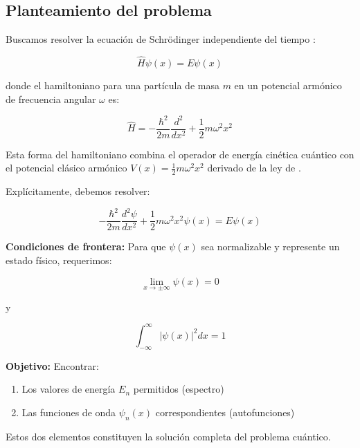 \documentclass[11pt,a4paper,spanish]{book}
\begin{document}
	\subsection{Planteamiento del problema}
	
	Buscamos resolver la ecuación de Schrödinger independiente del tiempo \citep{schrodinger1926a}:
	
	\begin{equation}
		\hat{H}\psi(x) = E\psi(x)
	\end{equation}
	
	donde el hamiltoniano para una partícula de masa $m$ en un potencial armónico de frecuencia angular $\omega$ es:
	
	\begin{equation}
		\hat{H} = -\frac{\hbar^2}{2m}\frac{d^2}{dx^2} + \frac{1}{2}m\omega^2 x^2
	\end{equation}
	
	Esta forma del hamiltoniano combina el operador de energía cinética cuántico con el potencial clásico armónico $V(x) = \frac{1}{2}m\omega^2 x^2$ derivado de la ley de \cite{hooke1678}.
	
	Explícitamente, debemos resolver:
	
	\begin{equation}
		-\frac{\hbar^2}{2m}\frac{d^2\psi}{dx^2} + \frac{1}{2}m\omega^2 x^2 \psi(x) = E\psi(x)
		\label{eq:schrodinger_oac}
	\end{equation}
	
	\textbf{Condiciones de frontera:} Para que $\psi(x)$ sea normalizable y represente un estado físico, requerimos:
	
	\begin{equation}
		\lim_{x \to \pm\infty} \psi(x) = 0
	\end{equation}
	
	y
	
	\begin{equation}
		\int_{-\infty}^{\infty} |\psi(x)|^2 dx = 1
	\end{equation}
	
	\textbf{Objetivo:} Encontrar:
	\begin{enumerate}
		\item Los valores de energía $E_n$ permitidos (espectro)
		\item Las funciones de onda $\psi_n(x)$ correspondientes (autofunciones)
	\end{enumerate}
	
	Estos dos elementos constituyen la solución completa del problema cuántico.
	
\end{document}
